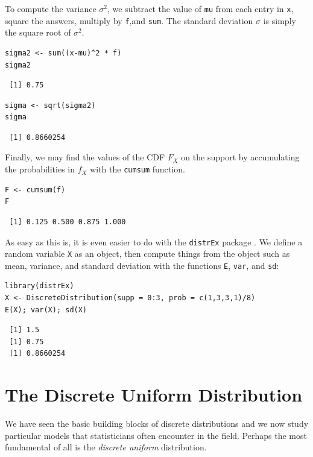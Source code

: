 \documentclass[captions=tableheading]{scrbook}
\begin{document}
To compute the variance \(\sigma^{2}\), we subtract the value of \texttt{mu} from each entry in \texttt{x}, square the answers, multiply by \texttt{f},and \texttt{sum}. The standard deviation \(\sigma\) is simply the square root of \(\sigma^{2}\).


\begin{verbatim}
sigma2 <- sum((x-mu)^2 * f)
sigma2
\end{verbatim}

\begin{verbatim}
 [1] 0.75
\end{verbatim}


\begin{verbatim}
sigma <- sqrt(sigma2)
sigma
\end{verbatim}

\begin{verbatim}
 [1] 0.8660254
\end{verbatim}

Finally, we may find the values of the CDF \(F_{X}\) on the support by accumulating the probabilities in \(f_{X}\) with the \texttt{cumsum} function. 


\begin{verbatim}
F <- cumsum(f)
F
\end{verbatim}

\begin{verbatim}
 [1] 0.125 0.500 0.875 1.000
\end{verbatim}

As easy as this is, it is even easier to do with the \texttt{distrEx} package \cite{Ruckdescheldistr}. We define a random variable \texttt{X} as an object, then compute things from the object such as mean, variance, and standard deviation with the functions \texttt{E}, \texttt{var}, and \texttt{sd}:


\begin{verbatim}
library(distrEx)
X <- DiscreteDistribution(supp = 0:3, prob = c(1,3,3,1)/8)
E(X); var(X); sd(X)
\end{verbatim}

\begin{verbatim}
 [1] 1.5
 [1] 0.75
 [1] 0.8660254
\end{verbatim}
\section{The Discrete Uniform Distribution}
\label{sec-5-2}
\label{sec-disc-uniform-dist}


We have seen the basic building blocks of discrete distributions and we now study particular models that statisticians often encounter in the field. Perhaps the most fundamental of all is the \emph{discrete uniform} distribution.
\end{document}
